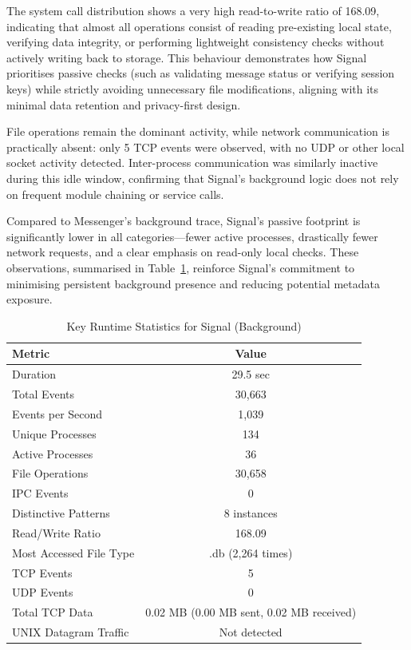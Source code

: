 \documentclass[a4paper,12pt]{report}
\begin{document}
The system call distribution shows a very high read-to-write ratio of 168.09, indicating that almost all operations consist of reading pre-existing local state, verifying data integrity, or performing lightweight consistency checks without actively writing back to storage. This behaviour demonstrates how Signal prioritises passive checks (such as validating message status or verifying session keys) while strictly avoiding unnecessary file modifications, aligning with its minimal data retention and privacy-first design.

File operations remain the dominant activity, while network communication is practically absent: only 5 TCP events were observed, with no UDP or other local socket activity detected. Inter-process communication was similarly inactive during this idle window, confirming that Signal's background logic does not rely on frequent module chaining or service calls.

Compared to Messenger’s background trace, Signal's passive footprint is significantly lower in all categories—fewer active processes, drastically fewer network requests, and a clear emphasis on read-only local checks. These observations, summarised in Table~\ref{tab:signal_background_key_stats}, reinforce Signal’s commitment to minimising persistent background presence and reducing potential metadata exposure.

\begin{table}[H]
    \centering
    \caption{Key Runtime Statistics for Signal (Background)}
    \label{tab:signal_background_key_stats}
    \begin{tabular}{|l|c|}
        \hline
        \textbf{Metric} & \textbf{Value} \\
        \hline
        Duration & 29.5 sec \\
        Total Events & 30,663 \\
        Events per Second & 1,039 \\
        Unique Processes & 134 \\
        Active Processes & 36 \\
        File Operations & 30,658 \\
        IPC Events & 0 \\
        Distinctive Patterns & 8 instances \\
        Read/Write Ratio & 168.09 \\
        Most Accessed File Type & .db (2,264 times) \\
        TCP Events & 5 \\
        UDP Events & 0 \\
        Total TCP Data & 0.02 MB (0.00 MB sent, 0.02 MB received) \\
        UNIX Datagram Traffic & Not detected \\
        \hline
    \end{tabular}
\end{table}
\end{document}
